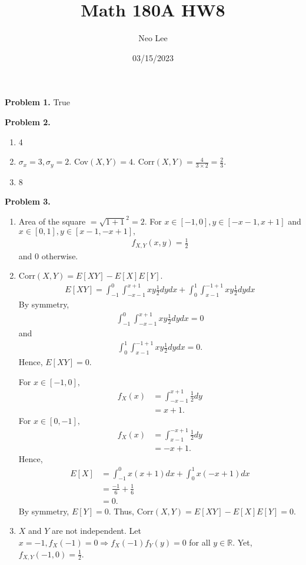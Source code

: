 \documentclass{article}
\title{Math 180A HW8}
\author{Neo Lee}
\date{03/15/2023}
\begin{document}
 

\maketitle 

\textbf{Problem 1.} True
\bigbreak

\textbf{Problem 2.}
\begin{enumerate}[label={(\alph*)}]
    \item 4
    \item $\sigma_x = 3, \sigma_y = 2$. Cov$(X,Y)=4$. Corr$(X,Y)=\frac{4}{3\times 2}=\frac{2}{3}$.
    \item 8
\end{enumerate}
\bigbreak

\textbf{Problem 3.}
\begin{enumerate}[label={(\alph*)}]
    \item 
    Area of the square $=\sqrt{1+1}^2=2.$ For $x\in[-1,0], y\in[-x-1,x+1]$ and $x\in[0,1],y\in[x-1,-x+1],$
    \begin{align}
        f_{X,Y}(x,y)=\frac{1}{2}
    \end{align}
    and 0 otherwise.

    \item 
    Corr$(X,Y)=E[XY]-E[X]E[Y]$.
    \begin{align}
        E[XY]=\int_{-1}^{0}\int_{-x-1}^{x+1}xy\frac{1}{2}dydx + \int_{0}^{1}\int_{x-1}^{-1+1}xy\frac{1}{2}dydx
    \end{align}
    By symmetry, 
    \begin{align}
        \int_{-1}^{0}\int_{-x-1}^{x+1}xy\frac{1}{2}dydx=0
    \end{align}
    and 
    \begin{align}
        \int_{0}^{1}\int_{x-1}^{-1+1}xy\frac{1}{2}dydx=0.
    \end{align}
    Hence, $E[XY]=0.$

    For $x\in[-1,0],$
    \begin{align}
        f_X(x)&=\int_{-x-1}^{x+1}\frac{1}{2}dy \\
        &= x+1.
    \end{align}
    For $x\in[0,-1],$
    \begin{align}
        f_X(x)&=\int_{x-1}^{-x+1}\frac{1}{2}dy \\
        &= -x+1.
    \end{align}
    Hence,
    \begin{align}
        E[X]&=\int_{-1}^{0}x(x+1)dx + \int_{0}^{1}x(-x+1)dx \\
        &=\frac{-1}{6}+\frac{1}{6} \\
        &=0.
    \end{align}
    By symmetry, $E[Y]=0.$ Thus, Corr$(X,Y)=E[XY]-E[X]E[Y]=0.$

    \item 
    $X$ and $Y$ are not independent. Let $x=-1,f_X(-1)=0\Rightarrow f_X(-1)f_Y(y)=0$ for all $y\in\mathbb{R}$. Yet, $f_{X,Y}(-1,0)=\frac{1}{2}$.
\end{enumerate}
\bigbreak
\end{document}
